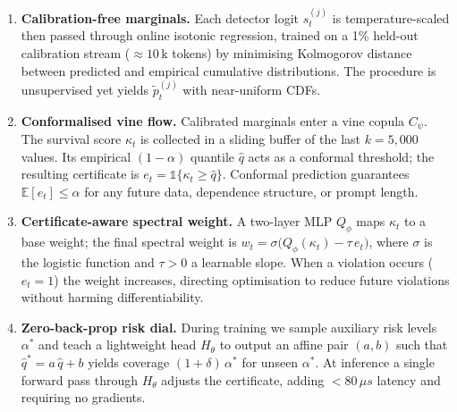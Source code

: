 \documentclass{article}
\begin{document}
\begin{enumerate}[label=\arabic*)]
  \item \textbf{Calibration-free marginals.} Each detector logit $s_{t}^{(j)}$ is temperature-scaled then passed through online isotonic regression, trained on a 1\% held-out calibration stream ($\approx 10\,\text{k}$ tokens) by minimising Kolmogorov distance between predicted and empirical cumulative distributions. The procedure is unsupervised yet yields $\tilde p_{t}^{(j)}$ with near-uniform CDFs.

  \item \textbf{Conformalised vine flow.} Calibrated marginals enter a vine copula $C_{\psi}$. The survival score $\kappa_{t}$ is collected in a sliding buffer of the last $k = 5{,}000$ values. Its empirical $(1-\alpha)$ quantile $\hat q$ acts as a conformal threshold; the resulting certificate is $e_{t} = \mathbb{1}\{\kappa_{t} \ge \hat q\}$. Conformal prediction guarantees $\mathbb{E}[e_{t}] \le \alpha$ for any future data, dependence structure, or prompt length.

  \item \textbf{Certificate-aware spectral weight.} A two-layer MLP $Q_{\phi}$ maps $\kappa_{t}$ to a base weight; the final spectral weight is $w_{t} = \sigma\bigl(Q_{\phi}(\kappa_{t}) - \tau \, e_{t}\bigr)$, where $\sigma$ is the logistic function and $\tau>0$ a learnable slope. When a violation occurs ($e_{t}=1$) the weight increases, directing optimisation to reduce future violations without harming differentiability.

  \item \textbf{Zero-back-prop risk dial.} During training we sample auxiliary risk levels $\alpha^{*}$ and teach a lightweight head $H_{\theta}$ to output an affine pair $(a,b)$ such that $\hat q^{*} = a\,\hat q+b$ yields coverage $(1+\delta)\,\alpha^{*}$ for unseen $\alpha^{*}$. At inference a single forward pass through $H_{\theta}$ adjusts the certificate, adding $<80\,\mu s$ latency and requiring no gradients.
\end{enumerate}
\end{document}
